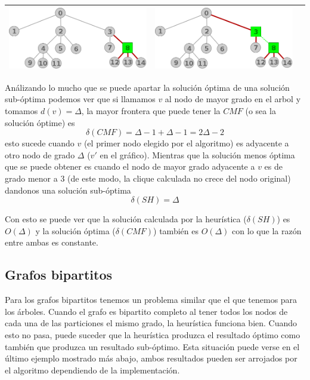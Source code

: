 \begin{center}
\begin{tabular}{ |c||c||c| }
			\includegraphics[scale = 0.3]{img/ej3/constructiva_golosa/tree_st11.png} &
			\includegraphics[scale = 0.3]{img/ej3/constructiva_golosa/tree_st12.png} \\
			\hline
		\end{tabular}
	\end{center}

An\'alizando lo mucho que se puede apartar la soluci\'on \'optima de una soluci\'on sub-\'optima
podemos ver que si llamamos $v$ al nodo de mayor grado en el arbol y tomamos $d(v) = \Delta$, la
mayor frontera que puede tener la $CMF$ (o sea la soluci\'on \'optime) es
\[ \delta(CMF) = \Delta -1 + \Delta -1 = 2 \Delta -2 \]
esto sucede cuando $v$ (el primer nodo elegido por el algoritmo) es adyacente a otro nodo de grado
$\Delta$ ($v'$ en el gr\'afico). Mientras que la soluci\'on menos \'optima que se puede obtener es 
cuando el nodo de mayor grado adyacente a $v$ es de grado menor a 3 
(de este modo, la clique calculada no crece del nodo original) dandonos una soluci\'on sub-\'optima
\[ \delta(SH) = \Delta \]

Con esto se puede ver que la soluci\'on calculada por la heur\'istica ($\delta(SH)$) es $O(\Delta)$ 
y la soluci\'on \'optima ($\delta(CMF)$) tambi\'en es $O(\Delta)$ con lo que la raz\'on entre ambas 
es constante.
			
\subsection{Grafos bipartitos}
	Para los grafos bipartitos tenemos un problema similar que el que tenemos para los \'arboles.
	Cuando el grafo es bipartito completo al tener todos los nodos de cada una de las particiones
	el mismo grado, la heur\'istica funciona bien. Cuando esto no pasa, puede suceder que la 
	heur\'istica produzca el resultado \'optimo como tambi\'en que produzca un resultado sub-\'optimo.
	Esta situaci\'on puede verse en el \'ultimo ejemplo mostrado m\'as abajo, ambos resultados pueden
	ser arrojados por el algoritmo dependiendo de la implementaci\'on. 
	

